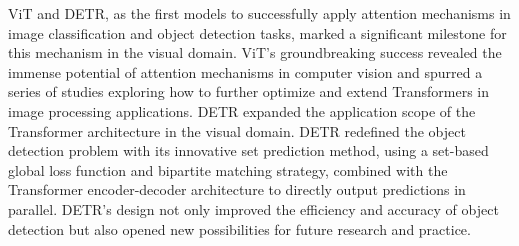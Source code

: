 \documentclass[journal]{IEEEtran}
\begin{document}
ViT and DETR, as the first models to successfully apply attention mechanisms in image classification and object detection tasks, marked a significant milestone for this mechanism in the visual domain. ViT's groundbreaking success revealed the immense potential of attention mechanisms in computer vision and spurred a series of studies exploring how to further optimize and extend Transformers in image processing applications. DETR expanded the application scope of the Transformer architecture in the visual domain. DETR redefined the object detection problem with its innovative set prediction method, using a set-based global loss function and bipartite matching strategy, combined with the Transformer encoder-decoder architecture to directly output predictions in parallel. DETR's design not only improved the efficiency and accuracy of object detection but also opened new possibilities for future research and practice.
\end{document}
